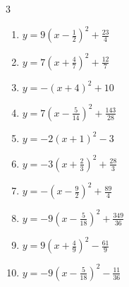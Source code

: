 \begin{multicols}{3}
\begin{enumerate}

  \item $\displaystyle y=9\left( x-\frac{1}{2}\right)^{2}+\frac{23}{4}$


  \item $\displaystyle y=7\left( x+\frac{4}{7}\right)^{2}+\frac{12}{7}$


  \item $\displaystyle y=-\left( x+4\right)^{2}+10$

        \phantom{$\displaystyle 頂点\left( -4 , 10 \right)$}

  \item $\displaystyle y=7\left( x-\frac{5}{14}\right)^{2}+\frac{143}{28}$


  \item $\displaystyle y=-2\left( x+1\right)^{2}-3$

        \phantom{$\displaystyle 頂点\left( -1 , -3 \right)$}

  \item $\displaystyle y=-3\left( x+\frac{2}{3}\right)^{2}+\frac{28}{3}$


  \item $\displaystyle y=-\left( x-\frac{9}{2}\right)^{2}+\frac{89}{4}$


  \item $\displaystyle y=-9\left( x-\frac{5}{18}\right)^{2}+\frac{349}{36}$


\columnbreak %

  \item $\displaystyle y=9\left( x+\frac{4}{9}\right)^{2}-\frac{61}{9}$


  \item $\displaystyle y=-9\left( x-\frac{5}{18}\right)^{2}-\frac{11}{36}$


\end{enumerate}
\end{multicols}
